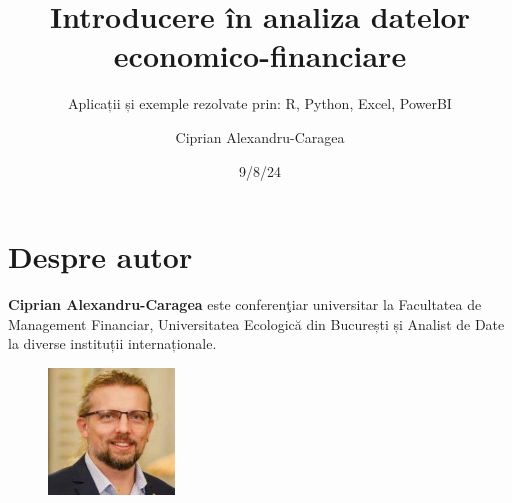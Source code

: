 \documentclass[
  11pt,
  b5paper,
  nottoc]{book}
\title{Introducere în analiza datelor economico-financiare}
\subtitle{Aplicații și exemple rezolvate prin: R, Python, Excel,
PowerBI}
\author{Ciprian Alexandru-Caragea}
\date{9/8/24}
\renewcommand{\contentsname}{Cuprins}
\renewcommand*\contentsname{Table of contents}
\newcommand\contentsname{Table of contents}
\begin{document}
\frontmatter
\maketitle
\ifdefined\Shaded\renewenvironment{Shaded}{\begin{tcolorbox}[borderline west={3pt}{0pt}{shadecolor}, enhanced, interior hidden, boxrule=0pt, frame hidden, sharp corners, breakable]}{\end{tcolorbox}}\fi

\renewcommand*\contentsname{Cuprins}
{
\setcounter{tocdepth}{1}
\tableofcontents
}
\listoffigures
\listoftables
\mainmatter
{}

\hypertarget{despre-autor}{%
\chapter*{Despre autor}\label{despre-autor}}


\setcounter{page}{3}

\textbf{Ciprian Alexandru-Caragea} este conferenţiar universitar la
Facultatea de Management Financiar, Universitatea Ecologică din
București și Analist de Date la diverse instituții internaționale.\\

\begin{figure}
  \begin{center}
    \includegraphics[width=0.3\textwidth]{images/Ciprian_DGINS2018.jpg}
  \end{center}
\end{figure}
\end{document}
